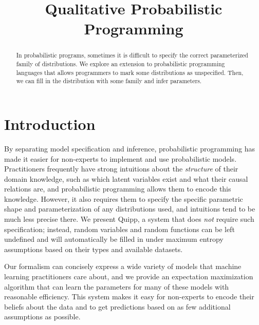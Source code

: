 \documentclass[proceed]{article}
\title{Qualitative Probabilistic Programming}
\author {}
\begin{document}
  \maketitle

  \begin{abstract}
    In probabilistic programs, sometimes it is difficult to specify the correct
    parameterized family of distributions.  We explore an extension to
    probabilistic programming languages that allows programmers to mark some
    distributions as unspecified.  Then, we can fill in the distribution with
    some family and infer parameters.
  \end{abstract}

  \section{Introduction}

  By separating model specification and inference, probabilistic programming 
  has made it easier for non-experts to implement and use probabilistic models.
  Practitioners frequently have strong intuitions about the {\em structure}
  of their domain knowledge, such as which latent variables exist and what
  their causal relations are, and probabilistic programming allows them to encode
  this knowledge. However, it also requires them to specify the specific parametric
  shape  and parameterization of any distributions used, and intuitions tend to
  be much less precise there.
  We present Quipp, a system that does {\em not} require such specification;
  instead, random variables and random functions can be left undefined
  and will automatically be filled in under maximum entropy assumptions
  based on their types and available datasets.
  
  Our formalism can concisely express a wide variety of models that machine
  learning practitioners care about, and we provide an expectation
  maximization algorithm that can learn the parameters for many of
  these models with reasonable efficiency. This system makes it easy
  for non-experts to encode their beliefs about the data and to get
  predictions based on as few additional assumptions as possible.
  
\end{document}
